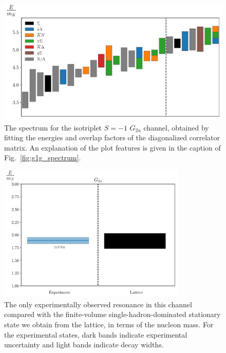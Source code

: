 \begin{figure}[H]
    \centering
    \hspace*{-0.5in}\includegraphics[width=\textwidth]{figures/sigmas/g2u/staircase_mk.pdf}
    \caption[The spectrum for the isotriplet $S=-1$ $G_{2u}$ channel, obtained by fitting the energies and overlap factors of the diagonalized correlator matrix.]{The spectrum for the isotriplet $S=-1$ $G_{2u}$ channel, obtained by fitting the energies and overlap factors of the diagonalized correlator matrix. An explanation of the plot features is given in the caption of Fig.~\ref{fig:g1g_spectrum}.}\label{fig:g2u_spectrum}
\end{figure}

\begin{figure}[H]
    \centering
    \hspace*{-1cm}\includegraphics[width=0.8\textwidth]{figures/sigmas/g2u/expvslat.pdf}
    \caption[The only experimentally observed resonance in this channel compared with the finite-volume single-hadron-dominated stationary state we obtain from the lattice, in terms of the nucleon mass.]{The only experimentally observed resonance in this channel compared with the finite-volume single-hadron-dominated stationary state we obtain from the lattice, in terms of the nucleon mass. For the experimental states, dark bands indicate experimental uncertainty and light bands indicate decay widths.}\label{fig:g2u_exp}
\end{figure}

